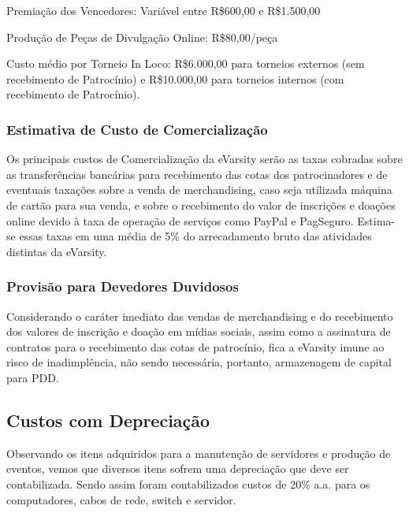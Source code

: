 \documentclass[a4paper, 12pt]{paper}
\begin{document}
Premiação dos Vencedores: Variável entre R\$600,00 e R\$1.500,00

Produção de Peças de Divulgação Online: R\$80,00/peça

Custo médio por Torneio In Loco: R\$6.000,00 para torneios externos (sem recebimento de Patrocínio) e R\$10.000,00 para torneios internos (com recebimento de Patrocínio).

\subsubsection{Estimativa de Custo de Comercialização}
Os principais custos de Comercialização da eVarsity serão as taxas cobradas sobre as transferências bancárias para recebimento das cotas dos patrocinadores e de eventuais taxações sobre a venda de merchandising, caso seja utilizada máquina de cartão para sua venda, e sobre o recebimento do valor de inscrições e doações online devido à taxa de operação de serviços como PayPal e PagSeguro. Estima-se essas taxas em uma média de 5\% do arrecadamento bruto das atividades distintas da eVarsity.

\subsubsection{Provisão para Devedores Duvidosos}
Considerando o caráter imediato das vendas de merchandising e do recebimento dos valores de inscrição e doação em mídias sociais, assim como a assinatura de contratos para o recebimento das cotas de patrocínio, fica a eVarsity imune ao risco de inadimplência, não sendo necessária, portanto, armazenagem de capital para PDD.

\subsection{Custos com Depreciação}
Observando os itens adquiridos para a manutenção de servidores e produção de eventos, vemos que diversos itens sofrem uma depreciação que deve ser contabilizada. Sendo assim foram contabilizados custos de 20\% a.a. para os computadores, cabos de rede, switch e servidor.
\end{document}
